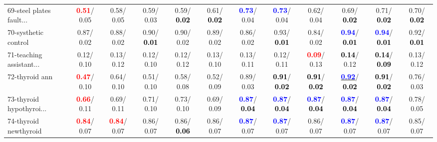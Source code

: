 \begin{table}[h]
\begin{center}
{\begin{tabular}{lc|c|c|c|c|c|c|c|c|c|c}
69-steel plates fault... & \textcolor{red}{\textbf{  0.51}}/  0.05 &   0.58/  0.05 &   0.59/  0.03 &   0.59/\textcolor{black}{\textbf{  0.02}} &   0.61/\textcolor{black}{\textbf{  0.02}} & \textcolor{blue}{\textbf{  0.73}}/  0.04 & \textcolor{blue}{\textbf{  0.73}}/  0.04 &   0.62/  0.04 &   0.69/\textcolor{black}{\textbf{  0.02}} &   0.71/\textcolor{black}{\textbf{  0.02}} &   0.70/\textcolor{black}{\textbf{  0.02}} \\
70-systhetic control &   0.87/  0.02 &   0.88/  0.02 &   0.90/\textcolor{black}{\textbf{  0.01}} &   0.90/  0.02 &   0.89/  0.02 &   0.86/  0.02 &   0.93/\textcolor{black}{\textbf{  0.01}} &   0.84/  0.02 & \textcolor{blue}{\textbf{  0.94}}/\textcolor{black}{\textbf{  0.01}} & \textcolor{blue}{\textbf{  0.94}}/\textcolor{black}{\textbf{  0.01}} &   0.92/\textcolor{black}{\textbf{  0.01}} \\
71-teaching assistant... &   0.12/  0.10 &   0.13/  0.12 &   0.12/  0.10 &   0.12/  0.12 &   0.13/  0.10 &   0.13/  0.11 &   0.12/  0.11 & \textcolor{red}{\textbf{  0.09}}/  0.13 & \textcolor{black}{\textbf{  0.14}}/  0.12 & \textcolor{black}{\textbf{  0.14}}/\textcolor{black}{\textbf{  0.09}} &   0.13/  0.12 \\ \hline
72-thyroid ann & \textcolor{red}{\textbf{  0.47}}/  0.10 &   0.64/  0.10 &   0.51/  0.10 &   0.58/  0.08 &   0.52/  0.09 &   0.89/  0.03 & \textcolor{black}{\textbf{  0.91}}/\textcolor{black}{\textbf{  0.02}} & \textcolor{black}{\textbf{  0.91}}/\textcolor{black}{\textbf{  0.02}} & \underline{\textcolor{blue}{\textbf{  0.92}}}/\textcolor{black}{\textbf{  0.02}} & \textcolor{black}{\textbf{  0.91}}/\textcolor{black}{\textbf{  0.02}} &   0.76/  0.03 \\
73-thyroid hypothyroi... & \textcolor{red}{\textbf{  0.66}}/  0.11 &   0.69/  0.11 &   0.71/  0.10 &   0.73/  0.10 &   0.69/  0.09 & \textcolor{blue}{\textbf{  0.87}}/\textcolor{black}{\textbf{  0.04}} & \textcolor{blue}{\textbf{  0.87}}/\textcolor{black}{\textbf{  0.04}} & \textcolor{blue}{\textbf{  0.87}}/\textcolor{black}{\textbf{  0.04}} & \textcolor{blue}{\textbf{  0.87}}/\textcolor{black}{\textbf{  0.04}} & \textcolor{blue}{\textbf{  0.87}}/\textcolor{black}{\textbf{  0.04}} &   0.78/  0.05 \\
74-thyroid newthyroid & \textcolor{red}{\textbf{  0.84}}/  0.07 & \textcolor{red}{\textbf{  0.84}}/  0.07 &   0.86/  0.07 &   0.86/\textcolor{black}{\textbf{  0.06}} &   0.86/  0.07 & \textcolor{blue}{\textbf{  0.87}}/  0.07 & \textcolor{blue}{\textbf{  0.87}}/  0.07 &   0.86/  0.07 & \textcolor{blue}{\textbf{  0.87}}/  0.07 & \textcolor{blue}{\textbf{  0.87}}/  0.07 &   0.85/  0.07 \\

\end{tabular}}
\end{center}
\end{table}
